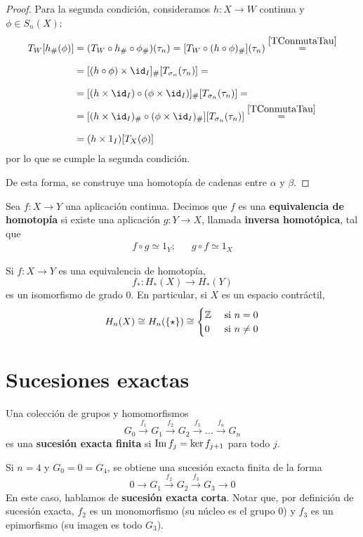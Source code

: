 \begin{proof}
Para la segunda condición, consideramos $h\colon X \to W$ continua y $\phi \in
S_n(X)$:
\begin{align*}
T_W[h_\#(\phi)]&=
	(T_W \circ h_\#\circ \phi_\#) (\tau_n)=
	[T_W\circ(h\circ \phi)_\#](\tau_n)\stackrel{\eqref{TConmutaTau}}{=}\\[8pt]
	&=[(h\circ\phi)\times \id_I]_\#[T_{\sigma_n}(\tau_n)]=\\[8pt]
	&=[(h\times \id_I)\circ(\phi\times \id_I)]_\#[T_{\sigma_n}(\tau_n)]=\\
	&=[(h\times \id_I)_\#\circ(\phi\times \id_I)_\#][T_{\sigma_n}(\tau_n)]
	\stackrel{\eqref{TConmutaTau}}{=}\\[8pt]
	&=(h\times 1_I)[T_X(\phi)]
\end{align*}
por lo que se cumple la segunda condición.

De esta forma, se construye una homotopía de cadenas entre $\alpha$ y $\beta$.
\end{proof}

Sea $f\colon X \to Y$ una aplicación continua. Decimos que $f$ es una
\textbf{equivalencia de homotopía} si existe una aplicación $g\colon Y \to X$,
llamada \textbf{inversa homotópica}, tal que
\begin{align*}
f\circ g \simeq 1_Y; && g \circ f \simeq 1_X
\end{align*}

\begin{corollary}\label{Contractil}
Si $f\colon X \to Y$ es una equivalencia de homotopía,
\[f_*: H_*(X) \to H_*(Y)\]
es un isomorfismo de grado 0. En particular, si $X$ es un espacio contráctil,
\[H_n(X)\cong H_n(\{\star\})\cong
\begin{cases}
\mathbb{Z} 	& \text{ si $n=0$}\\
0		& \text{ si $n \neq 0$}
\end{cases}\]
\end{corollary}

\section{Sucesiones exactas}
\begin{definition}
Una colección de grupos y homomorfismos
\[G_0 \xrightarrow{ f_1 } G_1 \xrightarrow{ f_2 } G_2 \xrightarrow{ f_3 }
\dots \xrightarrow{ f_n } G_n\]
es una \textbf{sucesión exacta finita} si $\operatorname{Im} f_j=\ker f_{j+1}$ para todo $j$.
\end{definition}

Si $n=4$ y $G_0=0=G_4$, se obtiene una sucesión exacta finita de la forma
\[0 \rightarrow G_1 \xrightarrow{ f_2 } G_2
\xrightarrow{ f_3 } G_3 \rightarrow 0\]
En este caso, hablamos de \textbf{sucesión exacta corta}. Notar que, por
definición de sucesión exacta, $f_2$ es un monomorfismo (su núcleo es el grupo 0)
y $f_3$ es un epimorfismo (su imagen es todo $G_3$).

